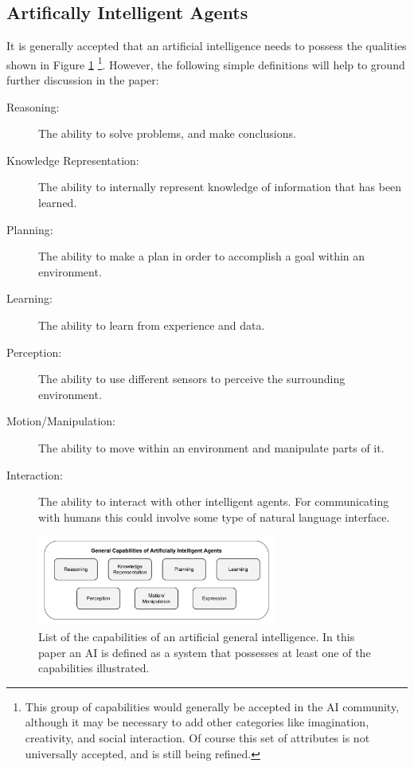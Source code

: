 \subsection{Artifically Intelligent Agents} \label{sec:aias}
    It is generally accepted that an artificial intelligence needs to possess the qualities shown in Figure \ref{fig:AIcapabilities} \cite{Russell2010-wv,Nilsson2009-rp,Luger2008-vf}\footnote{This group of capabilities would generally be accepted in the AI community, although it may be necessary to add other categories like imagination, creativity, and social interaction. Of course this set of attributes is not universally accepted, and is still being refined.}. However, the following simple definitions will help to ground further discussion in the paper:

    \begin{description}
        \item [Reasoning:] The ability to solve problems, and make conclusions.
        \item [Knowledge Representation:] The ability to internally represent knowledge of information that has been learned.
        \item [Planning:] The ability to make a plan in order to accomplish a goal within an environment.
        \item [Learning:] The ability to learn from experience and data.
        \item [Perception:] The ability to use different sensors to perceive the surrounding environment.
        \item [Motion/Manipulation:] The ability to move within an environment and manipulate parts of it.
        \item [Interaction:] The ability to interact with other intelligent agents. For communicating with humans this could involve some type of natural language interface.
    \end{description}

	\begin{figure}[htbp]
    	\centering
     	\includegraphics[width=0.7\textwidth]{Figures/AI_capabilities}
    	\caption{List of the capabilities of an artificial general intelligence. In this paper an AI is defined as a system that possesses at least one of the capabilities illustrated.}
        \label{fig:AIcapabilities}
    \end{figure}

